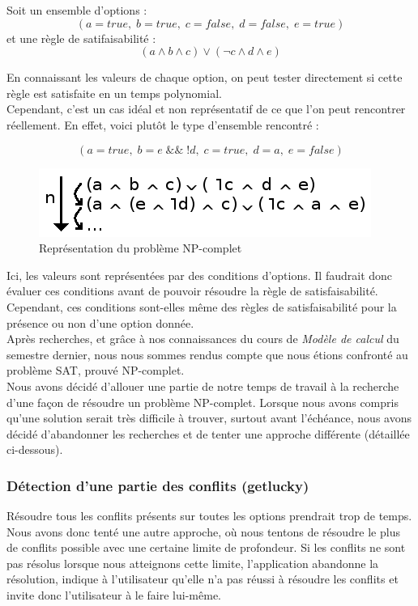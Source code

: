 ﻿\documentclass[17pts]{report}
\begin{document}
Soit un ensemble d'options :
\begin{equation}
    (a = true,\; b = true,\; c = false,\; d = false,\; e = true)
\end{equation}
et une règle de satifaisabilité :
\begin{equation}
(a \land b \land c) \lor (\lnot c \land d \land e)
\end{equation}

En connaissant les valeurs de chaque option, on peut tester directement si cette
règle est satisfaite en un temps polynomial.\\
Cependant, c'est un cas idéal et non représentatif de ce que l'on
peut rencontrer réellement. En effet, voici plutôt le type d'ensemble rencontré :

\begin{equation}
(a = true,\; b = e \;\&\&\; !d,\; c = true,\; d = a,\; e = false)
\end{equation}

\begin{figure}[H]
    \includegraphics[scale=1]{./illustrations/np_complet.png}
    \centering
    \caption{Représentation du problème NP-complet}
    \label{fig:NP-complet}
\end{figure}

Ici, les valeurs sont représentées par des conditions d'options. Il faudrait
donc évaluer ces conditions avant de pouvoir résoudre la règle de
satisfaisabilité. Cependant, ces conditions sont-elles même des règles de
satisfaisabilité pour la présence ou non d'une option donnée. \\ Après
recherches, et grâce à nos connaissances du cours de \textit{Modèle de calcul}
du semestre dernier, nous nous sommes rendus compte que nous étions confronté
au problème SAT, prouvé NP-complet.\\

Nous avons décidé d'allouer une partie de notre temps de travail à la recherche
d'une façon de résoudre un problème NP-complet. Lorsque nous avons compris
qu'une solution serait très difficile à trouver, surtout avant l'échéance, nous
avons décidé d'abandonner les recherches et de tenter une approche différente
(détaillée ci-dessous).

\subsubsection{Détection d'une partie des conflits (getlucky)}
\label{ssub:Problème NP-Complet (getlucky)}
Résoudre tous les conflits présents sur toutes les options prendrait trop de
temps.  Nous avons donc tenté une autre approche, où nous tentons de résoudre
le plus de conflits possible avec une certaine limite de profondeur. Si les
conflits ne sont pas résolus lorsque nous atteignons cette limite,
l'application abandonne la résolution, indique à l'utilisateur qu'elle n'a
pas réussi à résoudre les conflits et invite donc l'utilisateur à le faire
lui-même.\\
\end{document}
